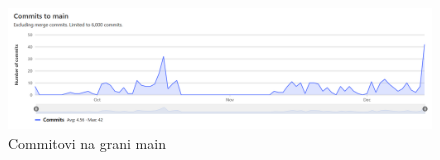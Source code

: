 		\begin{figure}[H]
				\includegraphics[width= 15 cm, height= 25 cm, keepaspectratio]{slike/CommitsToMain.png} 
				\centering
				\caption{Commitovi na grani main}
				\label{fig:commits}
		\end{figure}

